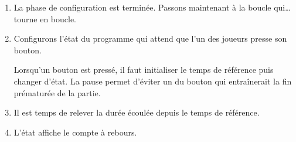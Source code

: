 \documentclass[letterpaper,10pt,french]{sphinxmanual}
\begin{document}
\begin{enumerate}
\item {} 
La phase de configuration est terminée. Passons maintenant
à la boucle qui… tourne en boucle.

%
\begin{sphinxVerbatim}[commandchars=\\\{\}]
 
\end{sphinxVerbatim}

\item {} 
Configurons l’état  du programme qui attend que l’un
des joueurs presse son bouton.

Lorsqu’un bouton est pressé, il faut initialiser le temps de
référence  puis changer d’état. La pause 
permet d’éviter un  du bouton
qui entraînerait la fin prématurée de la partie.

%
\begin{sphinxVerbatim}[commandchars=\\\{\}]
       
           
              
              
\end{sphinxVerbatim}

\item {} 
Il est temps de relever la durée écoulée depuis le temps de
référence.

%
\begin{sphinxVerbatim}[commandchars=\\\{\}]
      
\end{sphinxVerbatim}

\item {} 
L’état  affiche le compte à rebours.

%
\begin{sphinxVerbatim}[commandchars=\\\{\}]
               
\end{sphinxVerbatim}


\end{enumerate}
\end{document}
